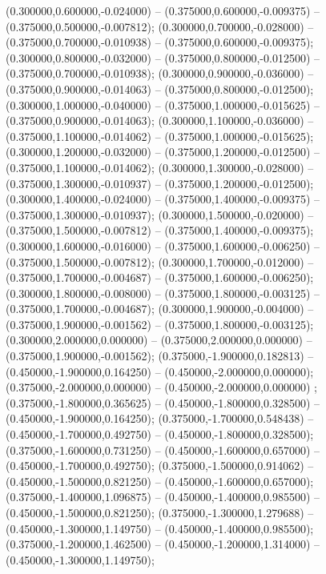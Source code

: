  (0.300000,0.600000,-0.024000) -- (0.375000,0.600000,-0.009375) -- (0.375000,0.500000,-0.007812);
 (0.300000,0.700000,-0.028000) -- (0.375000,0.700000,-0.010938) -- (0.375000,0.600000,-0.009375);
 (0.300000,0.800000,-0.032000) -- (0.375000,0.800000,-0.012500) -- (0.375000,0.700000,-0.010938);
 (0.300000,0.900000,-0.036000) -- (0.375000,0.900000,-0.014063) -- (0.375000,0.800000,-0.012500);
 (0.300000,1.000000,-0.040000) -- (0.375000,1.000000,-0.015625) -- (0.375000,0.900000,-0.014063);
 (0.300000,1.100000,-0.036000) -- (0.375000,1.100000,-0.014062) -- (0.375000,1.000000,-0.015625);
 (0.300000,1.200000,-0.032000) -- (0.375000,1.200000,-0.012500) -- (0.375000,1.100000,-0.014062);
 (0.300000,1.300000,-0.028000) -- (0.375000,1.300000,-0.010937) -- (0.375000,1.200000,-0.012500);
 (0.300000,1.400000,-0.024000) -- (0.375000,1.400000,-0.009375) -- (0.375000,1.300000,-0.010937);
 (0.300000,1.500000,-0.020000) -- (0.375000,1.500000,-0.007812) -- (0.375000,1.400000,-0.009375);
 (0.300000,1.600000,-0.016000) -- (0.375000,1.600000,-0.006250) -- (0.375000,1.500000,-0.007812);
 (0.300000,1.700000,-0.012000) -- (0.375000,1.700000,-0.004687) -- (0.375000,1.600000,-0.006250);
 (0.300000,1.800000,-0.008000) -- (0.375000,1.800000,-0.003125) -- (0.375000,1.700000,-0.004687);
 (0.300000,1.900000,-0.004000) -- (0.375000,1.900000,-0.001562) -- (0.375000,1.800000,-0.003125);
 (0.300000,2.000000,0.000000) -- (0.375000,2.000000,0.000000) -- (0.375000,1.900000,-0.001562);
 (0.375000,-1.900000,0.182813) -- (0.450000,-1.900000,0.164250) -- (0.450000,-2.000000,0.000000);
 (0.375000,-2.000000,0.000000) -- (0.450000,-2.000000,0.000000) ;
 (0.375000,-1.800000,0.365625) -- (0.450000,-1.800000,0.328500) -- (0.450000,-1.900000,0.164250);
 (0.375000,-1.700000,0.548438) -- (0.450000,-1.700000,0.492750) -- (0.450000,-1.800000,0.328500);
 (0.375000,-1.600000,0.731250) -- (0.450000,-1.600000,0.657000) -- (0.450000,-1.700000,0.492750);
 (0.375000,-1.500000,0.914062) -- (0.450000,-1.500000,0.821250) -- (0.450000,-1.600000,0.657000);
 (0.375000,-1.400000,1.096875) -- (0.450000,-1.400000,0.985500) -- (0.450000,-1.500000,0.821250);
 (0.375000,-1.300000,1.279688) -- (0.450000,-1.300000,1.149750) -- (0.450000,-1.400000,0.985500);
 (0.375000,-1.200000,1.462500) -- (0.450000,-1.200000,1.314000) -- (0.450000,-1.300000,1.149750);
